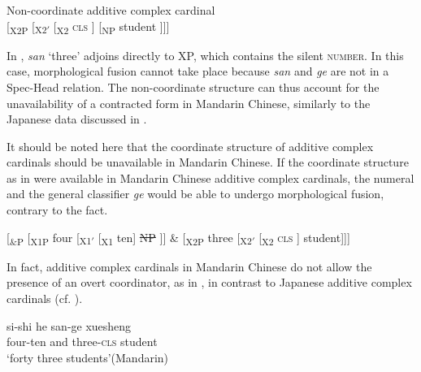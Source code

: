 \documentclass[output=paper]{langscibook}
\begin{document}
\ea\label{tat:ex:chi.contraction.st2}
Non-coordinate additive complex cardinal
\\{[}\textsubscript{X2P}  [\textsubscript{X2$'$} [\textsubscript{X2} \textsc{cls} ] [\textsubscript{NP} student ]]]
\z

\noindent In , \textit{san} `three' adjoins directly to XP, which contains the silent \textsc{number}. In this case, morphological fusion cannot take place because \textit{san} and \textit{ge} are not in a Spec-Head relation. The non-coordinate structure can thus account for the unavailability of a contracted form in Mandarin Chinese, similarly to the Japanese data discussed in . 

It should be noted here that the coordinate structure of additive complex cardinals should be unavailable in Mandarin Chinese. If the coordinate structure as in  were available in Mandarin Chinese additive complex cardinals, the numeral  and the general classifier \textit{ge} would be able to undergo morphological fusion, contrary to the fact.

\ea\label{tat:ex:chi.IandM.structure}
{[}\textsubscript{\&P} [\textsubscript{X1P} four [\textsubscript{X1$'$} [\textsubscript{X1} ten] \sout{NP} ]] \& [\textsubscript{X2P} three [\textsubscript{X2$'$} [\textsubscript{X2} \textsc{cls} ] student]]]
\z

\noindent In fact, additive complex cardinals in Mandarin Chinese do not allow the presence of an overt coordinator, as in , in contrast to Japanese additive complex cardinals (cf. ). 

\ea\label{tat:ex:chi.overt.coord}
\gll \llap{*}si-shi he san-ge xuesheng\\  
      four-ten and three-\textsc{cls} student\\ 
\glt `forty three students'\hfill(Mandarin)
\z
\end{document}
